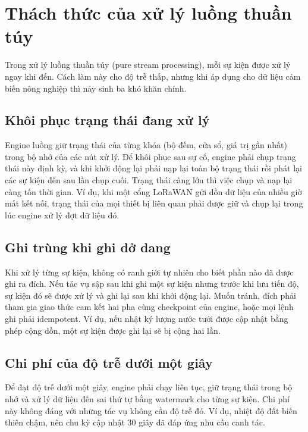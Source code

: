 \section{Thách thức của xử lý luồng thuần túy}
\label{sec:2-challenges}

Trong xử lý luồng thuần túy (pure stream processing), mỗi sự kiện được xử lý ngay khi đến. Cách làm này cho độ trễ thấp, nhưng khi áp dụng cho dữ liệu cảm biến nông nghiệp thì nảy sinh ba khó khăn chính.

\subsection{Khôi phục trạng thái đang xử lý}
Engine luồng giữ trạng thái của từng khóa (bộ đếm, cửa sổ, giá trị gần nhất) trong bộ nhớ của các nút xử lý. Để khôi phục sau sự cố, engine phải chụp trạng thái này định kỳ, và khi khởi động lại phải nạp lại toàn bộ trạng thái rồi phát lại các sự kiện đến sau lần chụp cuối. Trạng thái càng lớn thì việc chụp và nạp lại càng tốn thời gian. Ví dụ, khi một cổng LoRaWAN gửi dồn dữ liệu của nhiều giờ mất kết nối, trạng thái của mọi thiết bị liên quan phải được giữ và chụp lại trong lúc engine xử lý đợt dữ liệu đó.

\subsection{Ghi trùng khi ghi dở dang}
Khi xử lý từng sự kiện, không có ranh giới tự nhiên cho biết phần nào đã được ghi ra đích. Nếu tác vụ sập sau khi ghi một sự kiện nhưng trước khi lưu tiến độ, sự kiện đó sẽ được xử lý và ghi lại sau khi khởi động lại. Muốn tránh, đích phải tham gia giao thức cam kết hai pha cùng checkpoint của engine, hoặc mọi lệnh ghi phải idempotent. Ví dụ, nếu nhật ký lượng nước tưới được cập nhật bằng phép cộng dồn, một sự kiện được ghi lại sẽ bị cộng hai lần.

\subsection{Chi phí của độ trễ dưới một giây}
Để đạt độ trễ dưới một giây, engine phải chạy liên tục, giữ trạng thái trong bộ nhớ và xử lý dữ liệu đến sai thứ tự bằng watermark cho từng sự kiện. Chi phí này không đáng với những tác vụ không cần độ trễ đó. Ví dụ, nhiệt độ đất biến thiên chậm, nên chu kỳ cập nhật 30 giây đã đáp ứng nhu cầu canh tác.
